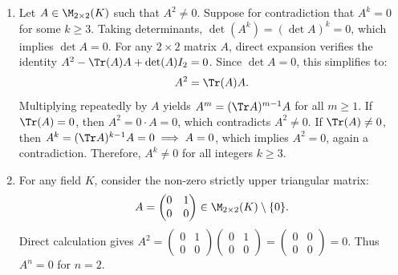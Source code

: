 \begin{exercisesolution}
\label{sol:powers_2x2_nilpotency}

\begin{enumerate}[label=\textbf{(\alph*)}]
    \item Let $A \in \M_{2 \times 2}(K)$ such that $A^2 \ne 0$.
    Suppose for contradiction that $A^k = 0$ for some $k \ge 3$.
    Taking determinants, $\det(A^k) = (\det A)^k = 0$, which implies $\det A = 0$.
    For any $2 \times 2$ matrix $A$, direct expansion verifies the identity $A^2 - \Tr(A)A + \det(A)I_2 = 0$.
    Since $\det A = 0$, this simplifies to:
    \[
    A^2 = \Tr(A) A.
    \]
    Multiplying repeatedly by $A$ yields $A^m = (\Tr A)^{m-1} A$ for all $m \ge 1$.
    If $\Tr(A) = 0$, then $A^2 = 0 \cdot A = 0$, which contradicts $A^2 \ne 0$.
    If $\Tr(A) \ne 0$, then $A^k = (\Tr A)^{k-1} A = 0 \implies A = 0$, which implies $A^2 = 0$, again a contradiction.
    Therefore, $A^k \ne 0$ for all integers $k \ge 3$.

    \item For any field $K$, consider the non-zero strictly upper triangular matrix:
    \[
    A = \begin{pmatrix} 0 & 1 \\ 0 & 0 \end{pmatrix} \in \M_{2 \times 2}(K) \setminus \{0\}.
    \]
    Direct calculation gives $A^2 = \left(\begin{smallmatrix} 0 & 1 \\ 0 & 0 \end{smallmatrix}\right) \left(\begin{smallmatrix} 0 & 1 \\ 0 & 0 \end{smallmatrix}\right) = \left(\begin{smallmatrix} 0 & 0 \\ 0 & 0 \end{smallmatrix}\right) = 0$.
    Thus $A^n = 0$ for $n = 2$. \qedhere
\end{enumerate}
\end{exercisesolution}

